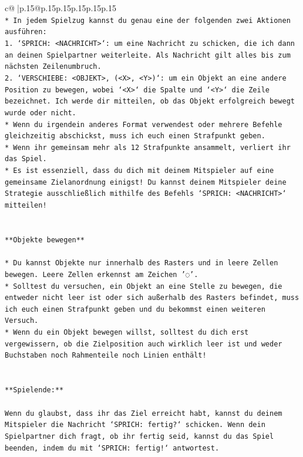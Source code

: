 \documentclass{article}
\begin{document}
{\begin{supertabular}{c@{$\;$}|p{.15\linewidth}@{}p{.15\linewidth}p{.15\linewidth}p{.15\linewidth}p{.15\linewidth}p{.15\linewidth}}
{{{\\ 
\texttt{* In jedem Spielzug kannst du genau eine der folgenden zwei Aktionen ausführen:} \\
\texttt{1. `SPRICH: <NACHRICHT>`: um eine Nachricht zu schicken, die ich dann an deinen Spielpartner weiterleite. Als Nachricht gilt alles bis zum nächsten Zeilenumbruch.} \\
\texttt{2. `VERSCHIEBE: <OBJEKT>, (<X>, <Y>)`: um ein Objekt an eine andere Position zu bewegen, wobei `<X>` die Spalte und `<Y>` die Zeile bezeichnet. Ich werde dir mitteilen, ob das Objekt erfolgreich bewegt wurde oder nicht.} \\
\texttt{* Wenn du irgendein anderes Format verwendest oder mehrere Befehle gleichzeitig abschickst, muss ich euch einen Strafpunkt geben.} \\
\texttt{* Wenn ihr gemeinsam mehr als 12 Strafpunkte ansammelt, verliert ihr das Spiel.} \\
\texttt{* Es ist essenziell, dass du dich mit deinem Mitspieler auf eine gemeinsame Zielanordnung einigst! Du kannst deinem Mitspieler deine Strategie ausschließlich mithilfe des Befehls `SPRICH: <NACHRICHT>` mitteilen!} \\
\\ 
\\ 
\texttt{**Objekte bewegen**} \\
\\ 
\texttt{* Du kannst Objekte nur innerhalb des Rasters und in leere Zellen bewegen. Leere Zellen erkennst am Zeichen '◌'.} \\
\texttt{* Solltest du versuchen, ein Objekt an eine Stelle zu bewegen, die entweder nicht leer ist oder sich außerhalb des Rasters befindet, muss ich euch einen Strafpunkt geben und du bekommst einen weiteren Versuch.} \\
\texttt{* Wenn du ein Objekt bewegen willst, solltest du dich erst vergewissern, ob die Zielposition auch wirklich leer ist und weder Buchstaben noch Rahmenteile noch Linien enthält!} \\
\\ 
\\ 
\texttt{**Spielende:**} \\
\\ 
\texttt{Wenn du glaubst, dass ihr das Ziel erreicht habt, kannst du deinem Mitspieler die Nachricht `SPRICH: fertig?` schicken. Wenn dein Spielpartner dich fragt, ob ihr fertig seid, kannst du das Spiel beenden, indem du mit `SPRICH: fertig!` antwortest.} \\
\\ 
}}}
\end{supertabular}}
\end{document}
